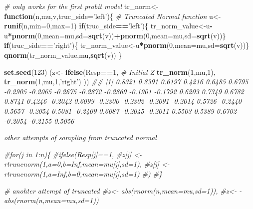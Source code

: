 \documentclass[
]{article}
\newenvironment{Shaded}{\begin{snugshade}}{\end{snugshade}}
\newcommand{\CommentTok}[1]{\textcolor[rgb]{0.56,0.35,0.01}{\textit{#1}}}
\newcommand{\ControlFlowTok}[1]{\textcolor[rgb]{0.13,0.29,0.53}{\textbf{#1}}}
\newcommand{\DataTypeTok}[1]{\textcolor[rgb]{0.13,0.29,0.53}{#1}}
\newcommand{\DecValTok}[1]{\textcolor[rgb]{0.00,0.00,0.81}{#1}}
\newcommand{\KeywordTok}[1]{\textcolor[rgb]{0.13,0.29,0.53}{\textbf{#1}}}
\newcommand{\NormalTok}[1]{#1}
\newcommand{\OperatorTok}[1]{\textcolor[rgb]{0.81,0.36,0.00}{\textbf{#1}}}
\newcommand{\StringTok}[1]{\textcolor[rgb]{0.31,0.60,0.02}{#1}}
\begin{document}
\begin{Shaded}
\begin{Highlighting}[]
\CommentTok{# only works for the first probit model}
\NormalTok{tr_norm<-}\ControlFlowTok{function}\NormalTok{(n,mu,v,}\DataTypeTok{truc_side=}\StringTok{'left'}\NormalTok{)\{ }\CommentTok{# Truncated Normal function}
\NormalTok{u<-}\KeywordTok{runif}\NormalTok{(n,}\DataTypeTok{min=}\DecValTok{0}\NormalTok{,}\DataTypeTok{max=}\DecValTok{1}\NormalTok{)}
  \ControlFlowTok{if}\NormalTok{(truc_side}\OperatorTok{==}\StringTok{'left'}\NormalTok{)\{}
\NormalTok{ tr_norm_value<-u}\OperatorTok{-}\NormalTok{u}\OperatorTok{*}\KeywordTok{pnorm}\NormalTok{(}\DecValTok{0}\NormalTok{,}\DataTypeTok{mean=}\NormalTok{mu,}\DataTypeTok{sd=}\KeywordTok{sqrt}\NormalTok{(v))}\OperatorTok{+}\KeywordTok{pnorm}\NormalTok{(}\DecValTok{0}\NormalTok{,}\DataTypeTok{mean=}\NormalTok{mu,}\DataTypeTok{sd=}\KeywordTok{sqrt}\NormalTok{(v))\}}
 \ControlFlowTok{if}\NormalTok{(truc_side}\OperatorTok{==}\StringTok{'right'}\NormalTok{)\{}
\NormalTok{   tr_norm_value<-u}\OperatorTok{*}\KeywordTok{pnorm}\NormalTok{(}\DecValTok{0}\NormalTok{,}\DataTypeTok{mean=}\NormalTok{mu,}\DataTypeTok{sd=}\KeywordTok{sqrt}\NormalTok{(v))\}}
  \KeywordTok{qnorm}\NormalTok{(tr_norm_value,mu,}\KeywordTok{sqrt}\NormalTok{(v))}
\NormalTok{\}}

\KeywordTok{set.seed}\NormalTok{(}\DecValTok{123}\NormalTok{)}
\NormalTok{(z<-}\StringTok{ }\KeywordTok{ifelse}\NormalTok{(Resp}\OperatorTok{==}\DecValTok{1}\NormalTok{, }\CommentTok{# Initial Z}
\KeywordTok{tr_norm}\NormalTok{(}\DecValTok{1}\NormalTok{,mu,}\DecValTok{1}\NormalTok{),}
\KeywordTok{tr_norm}\NormalTok{(}\DecValTok{1}\NormalTok{,mu,}\DecValTok{1}\NormalTok{,}\StringTok{'right'}\NormalTok{)}
\NormalTok{))}
\CommentTok{##  [1]  0.8321  0.8391  0.6197  0.4216  0.6485  0.6795 -0.2905 -0.2065 -0.2675 -0.2872 -0.2869 -0.1901 -0.1792  0.6203  0.7349  0.6782  0.8741  0.4246 -0.2042  0.6099 -0.2300 -0.2302 -0.2091 -0.2014  0.5726 -0.2440  0.5657 -0.2054  0.5081 -0.2409  0.6087 -0.2045 -0.2011  0.5503  0.5389  0.6702 -0.2054 -0.2155  0.5056}
\end{Highlighting}
\end{Shaded}

\emph{other attempts of sampling from truncated normal}

\begin{Shaded}
\begin{Highlighting}[]

\CommentTok{#for(j in 1:n)\{  }
\CommentTok{#ifelse(Resp[j]==1,}
\CommentTok{#z[j] <- rtruncnorm(1,a=0,b=Inf,mean=mu[j],sd=1),}
\CommentTok{#z[j] <- rtruncnorm(1,a=Inf,b=0,mean=mu[j],sd=1)}
\CommentTok{#)}
\CommentTok{#\}}

\CommentTok{# anohter attempt of truncated}
\CommentTok{#z<- abs(rnorm(n,mean=mu,sd=1)),}
\CommentTok{#z<- -abs(rnorm(n,mean=mu,sd=1))}
\end{Highlighting}
\end{Shaded}
\end{document}
